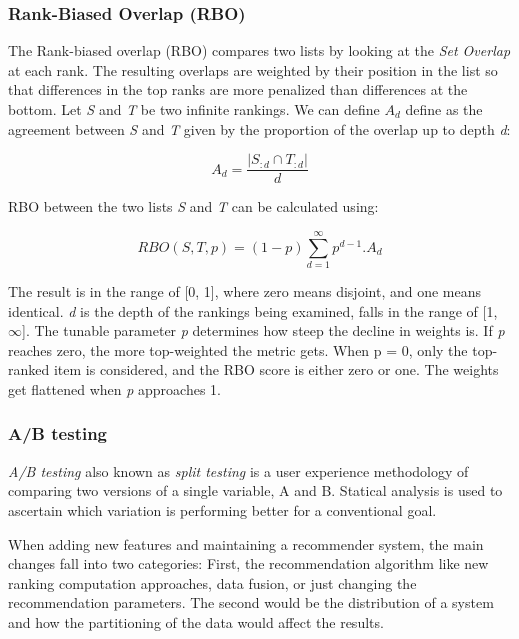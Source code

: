 \subsubsection{Rank-Biased Overlap (RBO)}
\label{subsubsec:rbo}
The Rank-biased overlap (RBO) \cite{webberSimilarityMeasureIndefinite2010} compares two lists by looking at the \emph{Set Overlap} at each rank. The resulting overlaps are weighted by their position in the list so that differences in the top ranks are more penalized than differences at the bottom. Let \emph{S} and \emph{T} be two infinite rankings. We can define $A_{d}$ define as the agreement between \emph{S} and \emph{T} given by the proportion of the overlap up to depth \emph{d}:

\begin{equation}
    A_{d} = \frac{|S_{:d} \cap T_{:d}|}{d}
    \label{eq:a-d}
\end{equation}


RBO between the two lists \emph{S} and \emph{T} can be calculated using:

\begin{equation}
    RBO(S,T,p) = (1-p)\sum_{d=1}^{\infty}p^{d-1}.A_{d}
    \label{eq:rbo}
\end{equation}


The result is in the range of [0, 1], where zero means disjoint, and one means identical. \emph{d} is the depth of the rankings being examined, falls in the range of [1, $\infty$]. The tunable parameter \emph{p} determines how steep the decline in weights is. If \emph{p} reaches zero, the more top-weighted the metric gets. When p = 0, only the top-ranked item is considered, and the RBO score is either zero or one. The weights get flattened when \emph{p} approaches 1.


\subsubsection{A/B testing}
\label{subsubsec:ab-testing}
\emph{A/B testing} also known as \emph{split testing} is a user experience methodology of comparing two versions of a single variable, A and B. Statical analysis is used to ascertain which variation is performing better for a conventional goal.

When adding new features and maintaining a recommender system, the main changes fall into two categories: First, the recommendation algorithm like new ranking computation approaches, data fusion, or just changing the recommendation parameters. The second would be the distribution of a system and how the partitioning of the data would affect the results. 


